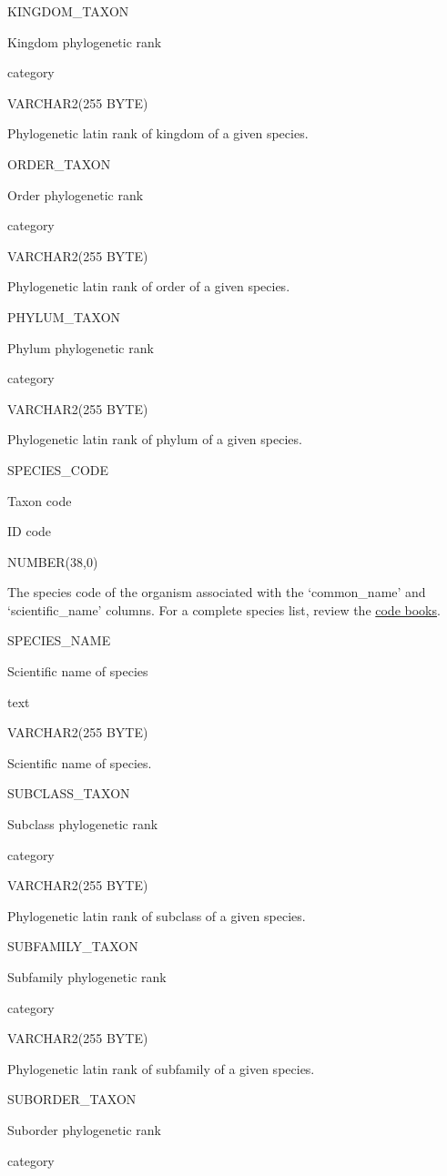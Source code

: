 \documentclass[
  letterpaper,
  oneside,
  open=any]{scrbook}
\begin{document}
KINGDOM\_TAXON

Kingdom phylogenetic rank

category

VARCHAR2(255 BYTE)

Phylogenetic latin rank of kingdom of a given species.

ORDER\_TAXON

Order phylogenetic rank

category

VARCHAR2(255 BYTE)

Phylogenetic latin rank of order of a given species.

PHYLUM\_TAXON

Phylum phylogenetic rank

category

VARCHAR2(255 BYTE)

Phylogenetic latin rank of phylum of a given species.

SPECIES\_CODE

Taxon code

ID code

NUMBER(38,0)

The species code of the organism associated with the `common\_name' and
`scientific\_name' columns. For a complete species list, review the
\href{https://www.fisheries.noaa.gov/resource/document/groundfish-survey-species-code-manual-and-data-codes-manual}{code
books}.

SPECIES\_NAME

Scientific name of species

text

VARCHAR2(255 BYTE)

Scientific name of species.

SUBCLASS\_TAXON

Subclass phylogenetic rank

category

VARCHAR2(255 BYTE)

Phylogenetic latin rank of subclass of a given species.

SUBFAMILY\_TAXON

Subfamily phylogenetic rank

category

VARCHAR2(255 BYTE)

Phylogenetic latin rank of subfamily of a given species.

SUBORDER\_TAXON

Suborder phylogenetic rank

category
\end{document}
